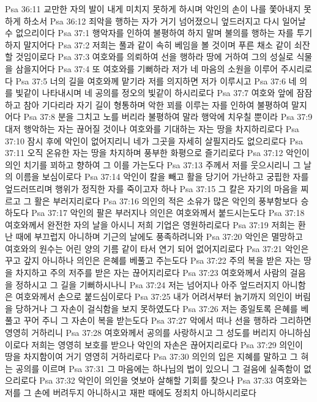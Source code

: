 Psa 36:11  교만한 자의 발이 내게 미치지 못하게 하시며 악인의 손이 나를 쫓아내지 못하게 하소서
Psa 36:12  죄악을 행하는 자가 거기 넘어졌으니 엎드러지고 다시 일어날 수 없으리이다
Psa 37:1  행악자를 인하여 불평하여 하지 말며 불의를 행하는 자를 투기하지 말지어다
Psa 37:2  저희는 풀과 같이 속히 베임을 볼 것이며 푸른 채소 같이 쇠잔할 것임이로다
Psa 37:3  여호와를 의뢰하여 선을 행하라 땅에 거하여 그의 성실로 식물을 삼을지어다
Psa 37:4  또 여호와를 기뻐하라 저가 네 마음의 소원을 이루어 주시리로다
Psa 37:5  너의 길을 여호와께 맡기라 저를 의지하면 저가 이루시고
Psa 37:6  네 의를 빛같이 나타내시며 네 공의를 정오의 빛같이 하시리로다
Psa 37:7  여호와 앞에 잠잠하고 참아 기다리라 자기 길이 형통하며 악한 꾀를 이루는 자를 인하여 불평하여 말지어다
Psa 37:8  분을 그치고 노를 버리라 불평하여 말라 행악에 치우칠 뿐이라
Psa 37:9  대저 행악하는 자는 끊어질 것이나 여호와를 기대하는 자는 땅을 차지하리로다
Psa 37:10  잠시 후에 악인이 없어지리니 네가 그곳을 자세히 살필지라도 없으리로다
Psa 37:11  오직 온유한 자는 땅을 차지하며 풍부한 화평으로 즐기리로다
Psa 37:12  악인이 의인 치기를 꾀하고 향하여 그 이를 가는도다
Psa 37:13  주께서 저를 웃으시리니 그 날의 이름을 보심이로다
Psa 37:14  악인이 칼을 빼고 활을 당기어 가난하고 궁핍한 자를 엎드러뜨리며 행위가 정직한 자를 죽이고자 하나
Psa 37:15  그 칼은 자기의 마음을 찌르고 그 활은 부러지리로다
Psa 37:16  의인의 적은 소유가 많은 악인의 풍부함보다 승하도다
Psa 37:17  악인의 팔은 부러지나 의인은 여호와께서 붙드시는도다
Psa 37:18  여호와께서 완전한 자의 날을 아시니 저희 기업은 영원하리로다
Psa 37:19  저희는 환난 때에 부끄럽지 아니하며 기근의 날에도 풍족하려니와
Psa 37:20  악인은 멸망하고 여호와의 원수는 어린 양의 기름 같이 타서 연기 되어 없어지리로다
Psa 37:21  악인은 꾸고 갚지 아니하나 의인은 은혜를 베풀고 주는도다
Psa 37:22  주의 복을 받은 자는 땅을 차지하고 주의 저주를 받은 자는 끊어지리로다
Psa 37:23  여호와께서 사람의 걸음을 정하시고 그 길을 기뻐하시나니
Psa 37:24  저는 넘어지나 아주 엎드러지지 아니함은 여호와께서 손으로 붙드심이로다
Psa 37:25  내가 어려서부터 늙기까지 의인이 버림을 당하거나 그 자손이 걸식함을 보지 못하였도다
Psa 37:26  저는 종일토록 은혜를 베풀고 꾸어 주니 그 자손이 복을 받는도다
Psa 37:27  악에서 떠나 선을 행하라 그리하면 영영히 거하리니
Psa 37:28  여호와께서 공의를 사랑하시고 그 성도를 버리지 아니하심이로다 저희는 영영히 보호를 받으나 악인의 자손은 끊어지리로다
Psa 37:29  의인이 땅을 차지함이여 거기 영영히 거하리로다
Psa 37:30  의인의 입은 지혜를 말하고 그 혀는 공의를 이르며
Psa 37:31  그 마음에는 하나님의 법이 있으니 그 걸음에 실족함이 없으리로다
Psa 37:32  악인이 의인을 엿보아 살해할 기회를 찾으나
Psa 37:33  여호와는 저를 그 손에 버려두지 아니하시고 재판 때에도 정죄치 아니하시리로다
